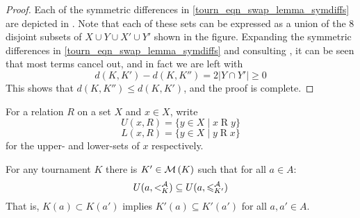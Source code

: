 \begin{proof}
    Each of the symmetric differences in \cref{tourn_eqn_swap_lemma_symdiffs} are
    depicted in . Note that each of these sets can
    be expressed as a union of the 8 disjoint subsets of $X \cup Y \cup X' \cup
    Y'$ shown in the figure. Expanding the symmetric differences in
    \cref{tourn_eqn_swap_lemma_symdiffs} and consulting ,
    it can be seen that most terms cancel out, and in fact we are left with
    \[
        d(K, K') - d(K, K'') = 2|Y \cap Y'|  \ge 0
    \]
    This shows that $d(K, K'') \le d(K, K')$, and the proof is complete.
\end{proof}

\begin{notation}
    For a relation $R$ on a set $X$ and $x \in X$, write
    \[ U(x, R) = \{y \in X \mid x \mathrel{R} y\} \]
    \[ L(x, R) = \{y \in X \mid y \mathrel{R} x\} \]
    for the upper- and lower-sets of $x$ respectively.
\end{notation}

\begin{lemma}
    \label{tourn_result_chainmin_mon_extend_strict_part}
    For any tournament $K$ there is $K' \in \operatorname{\mathcal{M}}\left({K}\right)$ such that for all $a \in
    A$:
    \[
        U(a, {<^{\mathcal{A}}_K}) \subseteq U(a, {\leqslant^{\mathcal{A}}_{K'}})
    \]
    That is, $K(a) \subset K(a')$ implies $K'(a) \subseteq K'(a')$ for all $a,
    a' \in A$.
\end{lemma}

